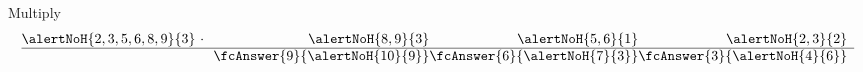 \begin{frame} 
\begin{example}
Multiply 
\[ 
\begin{array}{@{}r@{}r@{}r@{}r@{}r@{}r@{}r}&&\alertNoH{2, 3, 5, 6, 8, 9}{{3}}&~\cdot~~&\alertNoH{8, 9}{{3}}&\alertNoH{5, 6}{{1}}&\alertNoH{2, 3}{{2}}\\\hline 
&&&&\fcAnswer{9}{{\alertNoH{10}{{9}}}}&\fcAnswer{6}{{\alertNoH{7}{{3}}}}&\fcAnswer{3}{{\alertNoH{4}{{6}}}}\end{array}
\] 
$\displaystyle \phantom{\underbrace{\int 1}_{a}}$ 

\end{example}

\end{frame}